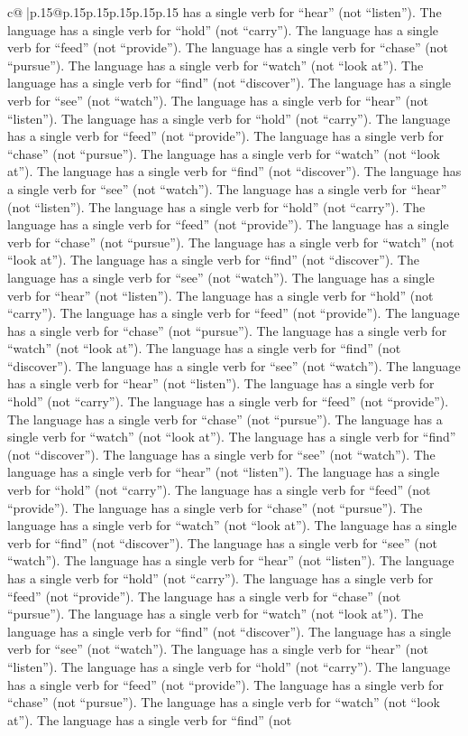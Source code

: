 \documentclass{article}
\begin{document}
{\begin{supertabular}{c@{$\;$}|p{.15\linewidth}@{}p{.15\linewidth}p{.15\linewidth}p{.15\linewidth}p{.15\linewidth}p{.15\linewidth}}
{{{has a single verb for “hear” (not “listen”). The language has a single verb for “hold” (not “carry”). The language has a single verb for “feed” (not “provide”). The language has a single verb for “chase” (not “pursue”). The language has a single verb for “watch” (not “look at”). The language has a single verb for “find” (not “discover”). The language has a single verb for “see” (not “watch”). The language has a single verb for “hear” (not “listen”). The language has a single verb for “hold” (not “carry”). The language has a single verb for “feed” (not “provide”). The language has a single verb for “chase” (not “pursue”). The language has a single verb for “watch” (not “look at”). The language has a single verb for “find” (not “discover”). The language has a single verb for “see” (not “watch”). The language has a single verb for “hear” (not “listen”). The language has a single verb for “hold” (not “carry”). The language has a single verb for “feed” (not “provide”). The language has a single verb for “chase” (not “pursue”). The language has a single verb for “watch” (not “look at”). The language has a single verb for “find” (not “discover”). The language has a single verb for “see” (not “watch”). The language has a single verb for “hear” (not “listen”). The language has a single verb for “hold” (not “carry”). The language has a single verb for “feed” (not “provide”). The language has a single verb for “chase” (not “pursue”). The language has a single verb for “watch” (not “look at”). The language has a single verb for “find” (not “discover”). The language has a single verb for “see” (not “watch”). The language has a single verb for “hear” (not “listen”). The language has a single verb for “hold” (not “carry”). The language has a single verb for “feed” (not “provide”). The language has a single verb for “chase” (not “pursue”). The language has a single verb for “watch” (not “look at”). The language has a single verb for “find” (not “discover”). The language has a single verb for “see” (not “watch”). The language has a single verb for “hear” (not “listen”). The language has a single verb for “hold” (not “carry”). The language has a single verb for “feed” (not “provide”). The language has a single verb for “chase” (not “pursue”). The language has a single verb for “watch” (not “look at”). The language has a single verb for “find” (not “discover”). The language has a single verb for “see” (not “watch”). The language has a single verb for “hear” (not “listen”). The language has a single verb for “hold” (not “carry”). The language has a single verb for “feed” (not “provide”). The language has a single verb for “chase” (not “pursue”). The language has a single verb for “watch” (not “look at”). The language has a single verb for “find” (not “discover”). The language has a single verb for “see” (not “watch”). The language has a single verb for “hear” (not “listen”). The language has a single verb for “hold” (not “carry”). The language has a single verb for “feed” (not “provide”). The language has a single verb for “chase” (not “pursue”). The language has a single verb for “watch” (not “look at”). The language has a single verb for “find” (not }}}
\end{supertabular}}
\end{document}
